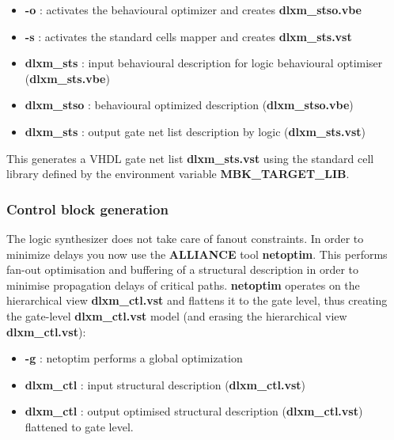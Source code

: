 \begin{itemize}
\item
{\bf -o } : activates the behavioural optimizer and creates {\bf dlxm\_stso.vbe}
\item
{\bf -s } : activates the standard cells mapper and creates {\bf dlxm\_sts.vst}
\item
{\bf dlxm\_sts} : input behavioural description for logic behavioural optimiser ({\bf dlxm\_sts.vbe})
\item
{\bf dlxm\_stso} : behavioural optimized description ({\bf dlxm\_stso.vbe})
\item
{\bf dlxm\_sts} : output gate net list description by logic ({\bf dlxm\_sts.vst})
\end{itemize}



This generates a VHDL gate net list {\bf dlxm\_sts.vst} using the
standard cell library defined by the environment variable
{\bf MBK\_TARGET\_LIB}.

    		\subsubsection{Control block generation }



The logic synthesizer does not take care of fanout constraints. 
In order to minimize delays
you now use the {\bf ALLIANCE} tool {\bf netoptim}. This performs
fan-out optimisation and buffering of a structural description in
order to minimise propagation delays of critical paths. {\bf netoptim} 
operates on the hierarchical view {\bf dlxm\_ctl.vst} and flattens it
to the gate level, thus creating the gate-level {\bf dlxm\_ctl.vst}
model (and erasing the hierarchical view {\bf dlxm\_ctl.vst}):


\begin{itemize}
\item
{\bf -g} : netoptim performs a global optimization
\item
{\bf dlxm\_ctl} : input structural description ({\bf dlxm\_ctl.vst})
\item
{\bf dlxm\_ctl} : output optimised structural description ({\bf dlxm\_ctl.vst})
flattened to gate level.
\end{itemize}


